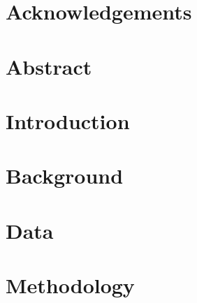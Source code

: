 \documentclass[english, a4paper, 12pt, twoside]{article}
\numberwithin{equation}{section} %
\begin{document}

\restoregeometry %

\thispagestyle{plain} %
\clearpage\mbox{}\clearpage %

\newpage
\section*{Acknowledgements}
    

\newpage
\section*{Abstract}
    

\newpage
{ %
\tableofcontents
}

\newpage
{ 
\listoffigures}
 
\newpage
{ 
\listoftables}

\newpage
{} %
\setcounter{page}{1} %

\section{Introduction} %
\clearpage %

\section{Background}
    
\clearpage

\section{Data}
    
\clearpage

\section{Methodology}
    
\clearpage
  
\end{document}
